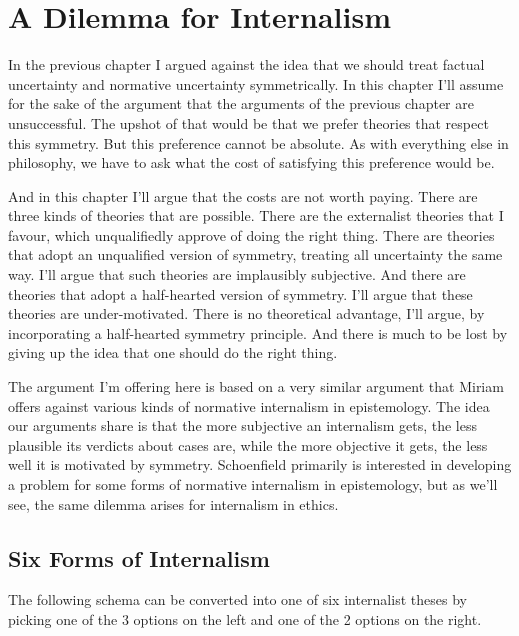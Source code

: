 \chapter{A Dilemma for Internalism}
\label{adilemmaforinternalism}

In the previous chapter I argued against the idea that we should treat factual uncertainty and normative uncertainty symmetrically. In this chapter I'll assume for the sake of the argument that the arguments of the previous chapter are unsuccessful. The upshot of that would be that we prefer theories that respect this symmetry. But this preference cannot be absolute. As with everything else in philosophy, we have to ask what the cost of satisfying this preference would be.

And in this chapter I'll argue that the costs are not worth paying. There are three kinds of theories that are possible. There are the externalist theories that I favour, which unqualifiedly approve of doing the right thing. There are theories that adopt an unqualified version of symmetry, treating all uncertainty the same way. I'll argue that such theories are implausibly subjective. And there are theories that adopt a half-hearted version of symmetry. I'll argue that these theories are under-motivated. There is no theoretical advantage, I'll argue, by incorporating a half-hearted symmetry principle. And there is much to be lost by giving up the idea that one should do the right thing.

The argument I'm offering here is based on a very similar argument that Miriam \citet{Schoenfield2014} offers against various kinds of normative internalism in epistemology. The idea our arguments share is that the more subjective an internalism gets, the less plausible its verdicts about cases are, while the more objective it gets, the less well it is motivated by symmetry. Schoenfield primarily is interested in developing a problem for some forms of normative internalism in epistemology, but as we'll see, the same dilemma arises for internalism in ethics.

\section{Six Forms of Internalism}
\label{sixformsofinternalism}

The following schema can be converted into one of six internalist theses by picking one of the 3 options on the left and one of the 2 options on the right.

